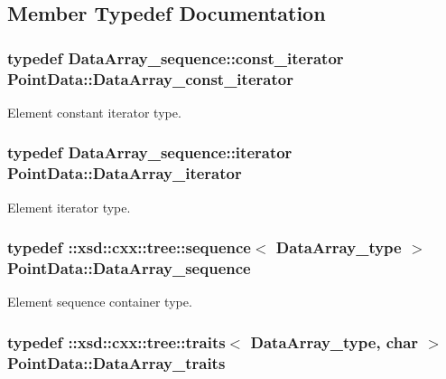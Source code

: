 \subsection{Member Typedef Documentation}
\hypertarget{classPointData_a6bd3313479b6a109e24bc9e7b306831b}{
\subsubsection[{Data\-Array\-\_\-const\-\_\-iterator}]{\setlength{\rightskip}{0pt plus 5cm}typedef Data\-Array\-\_\-sequence\-::const\-\_\-iterator {\bf Point\-Data\-::\-Data\-Array\-\_\-const\-\_\-iterator}}}\label{classPointData_a6bd3313479b6a109e24bc9e7b306831b}


Element constant iterator type. 

\hypertarget{classPointData_afb66f793f2a65ca38e3cd8fa21eef701}{
\subsubsection[{Data\-Array\-\_\-iterator}]{\setlength{\rightskip}{0pt plus 5cm}typedef Data\-Array\-\_\-sequence\-::iterator {\bf Point\-Data\-::\-Data\-Array\-\_\-iterator}}}\label{classPointData_afb66f793f2a65ca38e3cd8fa21eef701}


Element iterator type. 

\hypertarget{classPointData_acd882fa412789571fcaa2599ad2b2c71}{
\subsubsection[{Data\-Array\-\_\-sequence}]{\setlength{\rightskip}{0pt plus 5cm}typedef \-::xsd\-::cxx\-::tree\-::sequence$<$ {\bf Data\-Array\-\_\-type} $>$ {\bf Point\-Data\-::\-Data\-Array\-\_\-sequence}}}\label{classPointData_acd882fa412789571fcaa2599ad2b2c71}


Element sequence container type. 

\hypertarget{classPointData_ae9066a14984b6f7aa938ba2d58244055}{
\subsubsection[{Data\-Array\-\_\-traits}]{\setlength{\rightskip}{0pt plus 5cm}typedef \-::xsd\-::cxx\-::tree\-::traits$<$ {\bf Data\-Array\-\_\-type}, char $>$ {\bf Point\-Data\-::\-Data\-Array\-\_\-traits}}}\label{classPointData_ae9066a14984b6f7aa938ba2d58244055}


